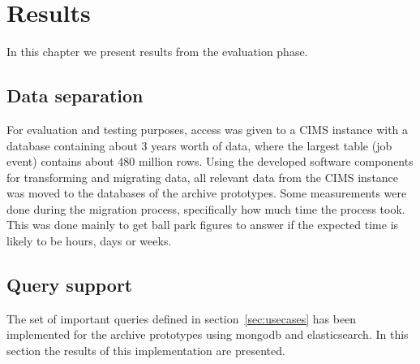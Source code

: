 \chapter{Results}
\label{chap:results}

In this chapter we present results from the evaluation phase.

\section{Data separation}
For evaluation and testing purposes, access was given to a CIMS instance with a database containing about 3 years worth of data, where the largest table (job event) contains about 480 million rows. Using the developed software components for transforming and migrating data, all relevant data from the CIMS instance was moved to the databases of the archive prototypes. Some measurements were done during the migration process, specifically how much time the process took. This was done mainly to get ball park figures to answer if the expected time is likely to be hours, days or weeks.



\section{Query support}

The set of important queries defined in section~\ref{sec:usecases} has been implemented for the archive prototypes using mongodb and elasticsearch. In this section the results of this implementation are presented.












